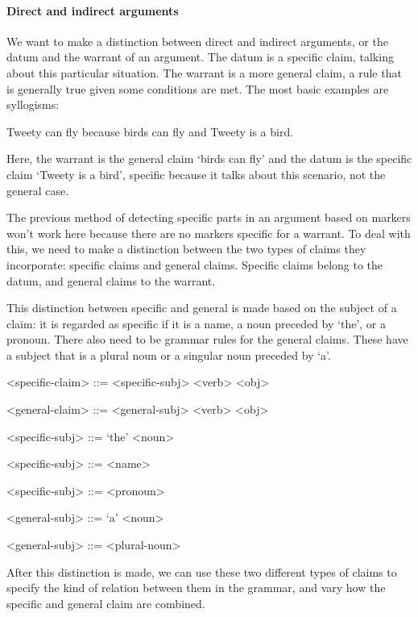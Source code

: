 \documentclass{IOS-Book-Article}
\begin{document}
\paragraph{Direct and indirect arguments}
 
We want to make a distinction between direct and indirect arguments, or the datum and the warrant of an argument. The datum is a specific claim, talking about this particular situation. The warrant is a more general claim, a rule that is generally true given some conditions are met. The most basic examples are syllogisms:

\begin{exe}
	\ex Tweety can fly because birds can fly and Tweety is a bird.
\end{exe}

\noindent Here, the warrant is the general claim `birds can fly' and the datum is the specific claim `Tweety is a bird', specific because it talks about this scenario, not the general case.

The previous method of detecting specific parts in an argument based on markers won't work here because there are no markers specific for a warrant. To deal with this, we need to make a distinction between the two types of claims they incorporate: specific claims and general claims. Specific claims belong to the datum, and general claims to the warrant.

This distinction between specific and general is made based on the subject of a claim: it is regarded as specific if it is a name, a noun preceded by `the', or a pronoun. There also need to be grammar rules for the general claims. These have a subject that is a plural noun or a singular noun preceded by `a'.

\begin{grammar}

<specific-claim> ::= <specific-subj> <verb> <obj>

<general-claim> ::= <general-subj> <verb> <obj>

<specific-subj> ::= `the' <noun>

<specific-subj> ::= <name>

<specific-subj> ::= <pronoun>

<general-subj> ::= `a' <noun>

<general-subj> ::= <plural-noun>

\end{grammar}

\noindent After this distinction is made, we can use these two different types of claims to specify the kind of relation between them in the grammar, and vary how the specific and general claim are combined.
\end{document}
